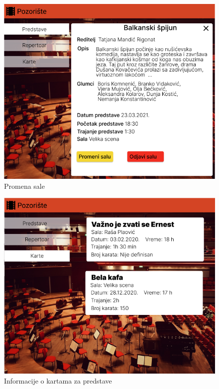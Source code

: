 \documentclass[a4paper]{article}
\begin{document}
\begin{figure}[H]
  \begin{center}
    \includegraphics[width=130mm]{../images/organizator_promena_sale.png}
  \end{center}
  \caption{Promena sale}
  \label{organizator_promena_sale}
\end{figure}

\begin{figure}[H]
  \begin{center}
    \includegraphics[width=130mm]{../images/organizator_karte.png}
  \end{center}
  \caption{Informacije o kartama za predstave}
  \label{organizator_karte}
\end{figure}
\end{document}
